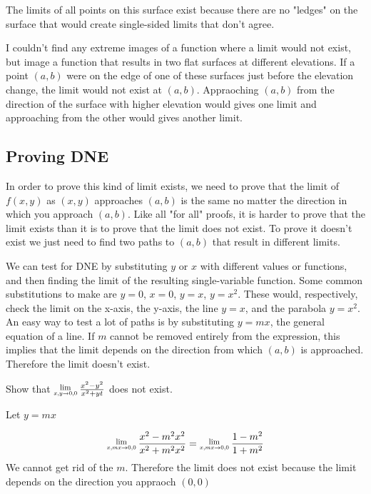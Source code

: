 \documentclass[12 pt]{article}
\begin{document}
        The limits of all points on this surface exist because there are no "ledges" on the surface that would create single-sided limits that don't agree.

        I couldn't find any extreme images of a function where a limit would not exist, but image a function that results in two flat surfaces at different elevations. If a point $(a,b)$ were on the edge of one of these surfaces just before the elevation change, the limit would not exist at $(a,b)$. Appraoching $(a,b)$ from the direction of the surface with higher elevation would gives one limit and approaching from the other would gives another limit.

        \subsection{Proving DNE}

        In order to prove this kind of limit exists, we need to prove that the limit of $f(x,y)$ as $(x,y)$ approaches $(a,b)$ is the same no matter the direction in which you approach $(a,b)$. Like all "for all" proofs, it is harder to prove that the limit exists than it is to prove that the limit does not exist. To prove it doesn't exist we just need to find two paths to $(a,b)$ that result in different limits.

        We can test for DNE by substituting $y$ or $x$ with different values or functions, and then finding the limit of the resulting single-variable function. Some common substitutions to make are $y=0$, $x=0$, $y=x$, $y=x^2$. These would, respectively, check the limit on the x-axis, the y-axis, the line $y=x$, and the parabola $y=x^2$. An easy way to test a lot of paths is by substituting $y=mx$, the general equation of a line. If $m$ cannot be removed entirely from the expression, this implies that the limit depends on the direction from which $(a,b)$ is approached. Therefore the limit doesn't exist.

        \begin{exmp*}
            Show that $\Lim{x,y\rightarrow 0,0}\frac{x^2-y^2}{x^2+y^^4}$ does not exist.

            Let $y=mx$

            $$\Lim{x,mx\rightarrow 0,0}\frac{x^2-m^2x^2}{x^2+m^2x^2}=\Lim{x,mx\rightarrow 0,0}\frac{1-m^2}{1+m^2}$$
            We cannot get rid of the $m$. Therefore the limit does not exist because the limit depends on the direction you appraoch $(0,0)$
        \end{exmp*}
\end{document}
